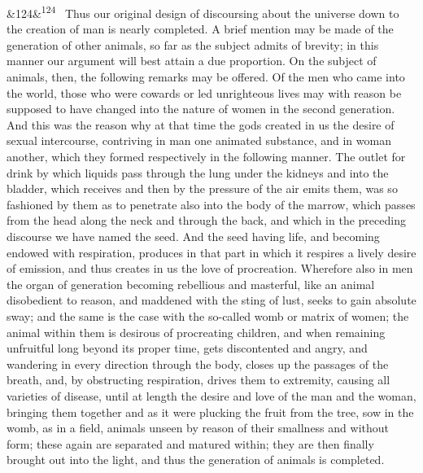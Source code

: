 \documentclass[12pt]{article}
\newcommand{\para}[1][]{\par\noindent\ifx&#1&\else\textsuperscript{\footnotesize #1}~\fi}
\begin{document}
\para[124] Thus our original design of discoursing about the universe down to the creation of man is nearly completed. A brief mention may be made of the generation of other animals, so far as the subject admits of brevity; in this manner our argument will best attain a due proportion. On the subject of animals, then, the following remarks may be offered. Of the men who came into the world, those who were cowards or led unrighteous lives may with reason be supposed to have changed into the nature of women in the second generation. And this was the reason why at that time the gods created in us the desire of sexual intercourse, contriving in man one animated substance, and in woman another, which they formed respectively in the following manner. The outlet for drink by which liquids pass through the lung under the kidneys and into the bladder, which receives and then by the pressure of the air emits them, was so fashioned by them as to penetrate also into the body of the marrow, which passes from the head along the neck and through the back, and which in the preceding discourse we have named the seed. And the seed having life, and becoming endowed with respiration, produces in that part in which it respires a lively desire of emission, and thus creates in us the love of procreation. Wherefore also in men the organ of generation becoming rebellious and masterful, like an animal disobedient to reason, and maddened with the sting of lust, seeks to gain absolute sway; and the same is the case with the so-called womb or matrix of women; the animal within them is desirous of procreating children, and when remaining unfruitful long beyond its proper time, gets discontented and angry, and wandering in every direction through the body, closes up the passages of the breath, and, by obstructing respiration, drives them to extremity, causing all varieties of disease, until at length the desire and love of the man and the woman, bringing them together and as it were plucking the fruit from the tree, sow in the womb, as in a field, animals unseen by reason of their smallness and without form; these again are separated and matured within; they are then finally brought out into the light, and thus the generation of animals is completed.
\end{document}
